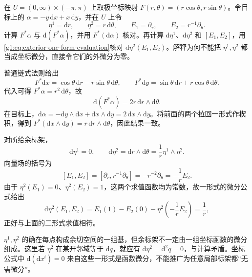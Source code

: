 \begin{exercise}\label{g1:ex:exterior-polar-coframe}
	在 \(U=(0,\infty)\times(-\pi,\pi)\) 上取极坐标映射 \(F(r,\theta)=(r\cos\theta,r\sin\theta)\)。令目标上的 \(\alpha=-y\,\mathrm{d}x+x\,\mathrm{d}y\)，并在 \(U\) 上令
	\[
		\eta^1=\mathrm{d}r,\qquad \eta^2=r\,\mathrm{d}\theta,\qquad
		E_1=\partial_r,\qquad E_2=r^{-1}\partial_\theta.
	\]
	计算 \(F^*\alpha\) 与 \(\mathrm{d}(F^*\alpha)\)，并用 \(F^*(\mathrm{d}\alpha)\) 核对。再计算 \(\mathrm{d}\eta^1\)、\(\mathrm{d}\eta^2\) 和 \([E_1,E_2]\)，用\eqref{g1:eq:exterior-one-form-evaluation}核对 \(\mathrm{d}\eta^2(E_1,E_2)\)。解释为何不能把 \(\eta^1,\eta^2\) 都当成坐标微分，直接令它们的外微分为零。
\end{exercise}
\begin{solution}
	普通链式法则给出
	\[
		F^*\mathrm{d}x=\cos\theta\,\mathrm{d}r-r\sin\theta\,\mathrm{d}\theta,\qquad
		F^*\mathrm{d}y=\sin\theta\,\mathrm{d}r+r\cos\theta\,\mathrm{d}\theta.
	\]
	代入可得 \(F^*\alpha=r^2\,\mathrm{d}\theta\)，故
	\[
		\mathrm{d}(F^*\alpha)=2r\,\mathrm{d}r\wedge\mathrm{d}\theta.
	\]
	在目标上，\(\mathrm{d}\alpha=-\mathrm{d}y\wedge\mathrm{d}x+\mathrm{d}x\wedge\mathrm{d}y=2\,\mathrm{d}x\wedge\mathrm{d}y\)。将前面的两个拉回一形式作楔积，得到 \(F^*(\mathrm{d}x\wedge\mathrm{d}y)=r\,\mathrm{d}r\wedge\mathrm{d}\theta\)，因此结果一致。

	对所给余标架，
	\[
		\mathrm{d}\eta^1=0,\qquad
		\mathrm{d}\eta^2=\mathrm{d}r\wedge\mathrm{d}\theta
		=\frac1r\eta^1\wedge\eta^2.
	\]
	向量场的括号为
	\[
		[E_1,E_2]=[\partial_r,r^{-1}\partial_\theta]
		=-r^{-2}\partial_\theta=-\frac1r E_2.
	\]
	由于 \(\eta^2(E_1)=0\)、\(\eta^2(E_2)=1\)，这两个求值函数均为常数，故一形式的微分公式给出
	\[
		\mathrm{d}\eta^2(E_1,E_2)
		=E_1(1)-E_2(0)-\eta^2\left(-\frac1rE_2\right)=\frac1r,
	\]
	正好与上面的二形式求值相符。

	\(\eta^1,\eta^2\) 的确在每点构成余切空间的一组基，但余标架不一定由一组坐标函数的微分组成。这里若 \(\eta^2\) 在某开邻域等于 \(\mathrm{d}q\)，就应有 \(\mathrm{d}\eta^2=\mathrm{d}^2q=0\)，与计算矛盾。坐标公式中 \(\mathrm{d}(\mathrm{d}x^i)=0\) 来自这些一形式是函数微分，不能推广为任意局部标架都“无需微分”。
\end{solution}

